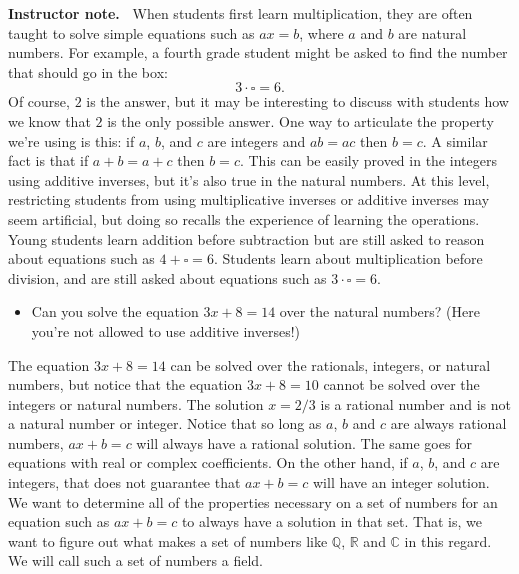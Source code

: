 \documentclass[11pt]{article}
\newenvironment{bignote}[1][Instructor note]%
	{\begin{mdframed}\raggedright{\bf #1.~}}
	{\end{mdframed}}
\newenvironment{task}
	{\begin{mdframed}[linecolor=lightgray, linewidth=3pt]\raggedright}
	{\end{mdframed}}
\theoremstyle{definition}
\begin{document}
\begin{bignote}
  When students first learn multiplication, they are often taught to solve simple equations such as $ax = b$, where $a$ and $b$ are natural numbers. For example, a
  fourth grade student might be asked to find the number that should go in the box:
  \[ 3\cdot \square = 6. \]
  Of course, $2$ is the answer, but it may be interesting to discuss with students how we know that $2$ is the only possible answer. One way to articulate the property we're using
  is this: if $a$, $b$, and $c$ are integers and $ab=ac$ then $b=c$. A similar fact is that if $a+b=a+c$ then $b=c$. This can be easily proved in the integers using additive inverses,
  but it's also true in the natural numbers. At this level, restricting students from using multiplicative inverses or additive inverses may seem artificial, but doing so recalls
  the experience of learning the operations. Young students learn addition before subtraction but are still asked to reason about equations such as $4 + \square =  6$. Students learn
  about multiplication before division, and are still asked about equations such as $3\cdot \square = 6$. 
\end{bignote}

\begin{task}
  \begin{itemize}
    \item Can you solve the equation $3x+8=14$ over the natural numbers? (Here you're not allowed to use additive inverses!)
  \end{itemize}
\end{task}

The equation $3x+8=14$ can be solved over the rationals, integers, or natural numbers, but notice that the equation $3x+8=10$ cannot be solved over
the integers or natural numbers. The solution $x=2/3$ is a rational number and is not a natural number or integer. Notice that so long as $a$, $b$ and
$c$ are always rational numbers, $ax+b=c$ will always have a rational solution.  The same goes for equations with real or complex coefficients. On the
other hand, if $a$, $b$, and $c$ are integers, that does not guarantee that $ax+b=c$ will have an integer solution. We want to determine all of the 
properties necessary on a set of numbers for an equation such as $ax+b=c$ to always have a solution in that set. That is, we want to figure out
what makes a set of numbers like $\mathbb{Q}$, $\mathbb{R}$ and $\mathbb{C}$ in this regard. We will call such a set of numbers a field.
\end{document}
